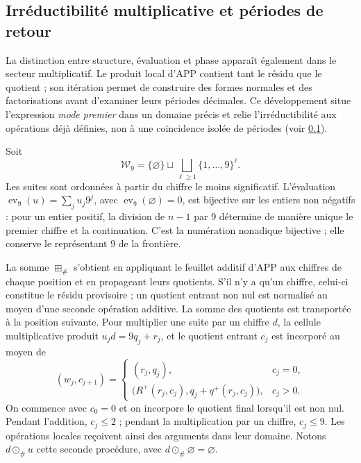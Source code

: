 \subsection{Irréductibilité multiplicative et périodes de retour}
\label{primos-retornos}

La distinction entre structure, évaluation et phase apparaît également dans le
secteur multiplicatif. Le produit local d’APP contient tant le résidu
que le quotient ; son itération permet de construire des formes normales et des
factorisations avant d’examiner leurs périodes décimales. Ce développement
situe l’expression \emph{mode premier} dans un domaine précis et relie
l’irréductibilité aux opérations déjà définies, non à une coïncidence
isolée de périodes (voir \ref{primos-retornos}).

Soit
\[
 \mathcal W_9=\{\varnothing\}\sqcup
 \bigsqcup_{\ell\geq1}\{1,\ldots,9\}^{\ell}.
\]
Les suites sont ordonnées à partir du chiffre le moins significatif. L'évaluation
\(\operatorname{ev}_9(u)=\sum_j u_j9^j\), avec
\(\operatorname{ev}_9(\varnothing)=0\), est bijective sur les entiers non
négatifs : pour un entier positif, la division de \(n-1\) par \(9\)
détermine de manière unique le premier chiffre et la continuation. C'est la
numération nonadique bijective ; elle conserve le représentant \(9\) de la
frontière.

La somme \(\boxplus_\#\) s'obtient en appliquant le feuillet additif d'APP aux chiffres de chaque position et en propageant leurs quotients. S'il n'y a qu'un chiffre, celui-ci constitue le résidu provisoire ; un quotient entrant non nul est normalisé au moyen d'une seconde opération additive. La somme des quotients est transportée à la position suivante. Pour multiplier une suite par un chiffre \(d\), la cellule multiplicative produit \(u_jd=9q_j+r_j\), et le quotient entrant \(c_j\) est incorporé au moyen de
\[
 (w_j,c_{j+1})=
 \begin{cases}
 (r_j,q_j),&c_j=0,\\
 \bigl(R^+(r_j,c_j),q_j+q^+(r_j,c_j)\bigr),&c_j>0.
 \end{cases}
\]
On commence avec \(c_0=0\) et on incorpore le quotient final lorsqu'il est non
nul. Pendant l'addition, \(c_j\leq2\) ; pendant la multiplication par un chiffre,
\(c_j\leq9\). Les opérations locales reçoivent ainsi des arguments dans
leur domaine. Notons \(d\odot_\#u\) cette seconde procédure,
avec \(d\odot_\#\varnothing=\varnothing\).

